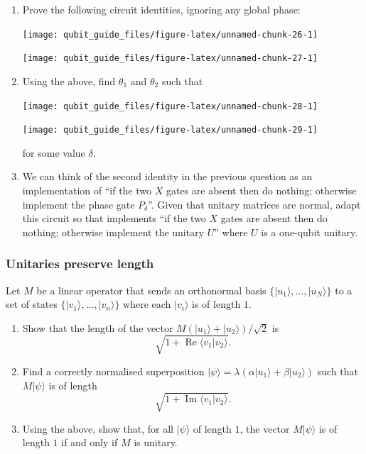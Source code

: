 \documentclass[fleqn,a4paper]{article}
\providecommand{\tightlist}{\setlength{\itemsep}{0pt}\setlength{\parskip}{0pt}}
\theoremstyle{definition}
\theoremstyle{definition}
\theoremstyle{definition}
\theoremstyle{definition}
\theoremstyle{remark}
\begin{document}
\begin{enumerate}
\def\labelenumi{\arabic{enumi}.}
\item
  Prove the following circuit identities, ignoring any global phase:

  \begin{center}\texttt{[image: qubit\_guide\_files/figure-latex/unnamed-chunk-26-1]} \end{center}

  \begin{center}\texttt{[image: qubit\_guide\_files/figure-latex/unnamed-chunk-27-1]} \end{center}
\item
  Using the above, find \(\theta_1\) and \(\theta_2\) such that

  \begin{center}\texttt{[image: qubit\_guide\_files/figure-latex/unnamed-chunk-28-1]} \end{center}

  \begin{center}\texttt{[image: qubit\_guide\_files/figure-latex/unnamed-chunk-29-1]} \end{center}

  for some value \(\delta\).
\item
  We can think of the second identity in the previous question as an implementation of ``if the two \(X\) gates are absent then do nothing; otherwise implement the phase gate \(P_\delta\)''.
  Given that unitary matrices are normal, adapt this circuit so that implements ``if the two \(X\) gates are absent then do nothing; otherwise implement the unitary \(U\)'' where \(U\) is a one-qubit unitary.
\end{enumerate}

\hypertarget{unitaries-preserve-length}{%
\subsubsection{Unitaries preserve length}\label{unitaries-preserve-length}}

Let \(M\) be a linear operator that sends an orthonormal basis \(\{|u_1\rangle,\ldots,|u_N\rangle\}\) to a set of states \(\{|v_1\rangle,\ldots,|v_n\rangle\}\) where each \(|v_i\rangle\) is of length \(1\).

\begin{enumerate}
\def\labelenumi{\arabic{enumi}.}
\tightlist
\item
  Show that the length of the vector \(M(|u_1\rangle+|u_2\rangle)/\sqrt{2}\) is
  \[
   \sqrt{1+\operatorname{Re}\langle v_1|v_2\rangle}.
    \]
\item
  Find a correctly normalised superposition \(|\psi\rangle=\lambda(\alpha|u_1\rangle+\beta|u_2\rangle)\) such that \(M|\psi\rangle\) is of length
  \[
   \sqrt{1+\operatorname{Im}\langle v_1|v_2\rangle}.
    \]
\item
  Using the above, show that, for all \(|\psi\rangle\) of length \(1\), the vector \(M|\psi\rangle\) is of length \(1\) if and only if \(M\) is unitary.
\end{enumerate}
\end{document}
